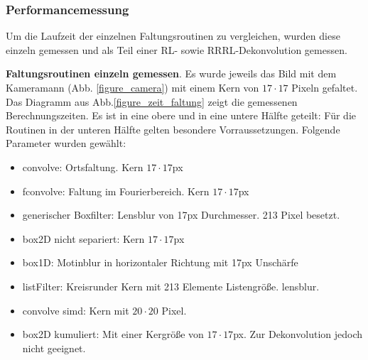 \documentclass[a4paper,12pt]{article}
\begin{document}
\subsubsection{Performancemessung}
Um die Laufzeit der einzelnen Faltungsroutinen zu vergleichen, wurden diese
einzeln gemessen und als Teil einer RL- sowie RRRL-Dekonvolution gemessen.

\textbf{Faltungsroutinen einzeln gemessen}. Es wurde jeweils das Bild mit dem
Kameramann (Abb. \ref{figure_camera}) mit einem Kern von $17 \cdot 17$ Pixeln
gefaltet. Das Diagramm aus Abb.\ref{figure_zeit_faltung} zeigt die gemessenen
Berechnungszeiten. Es ist in eine obere und in eine untere Hälfte geteilt: 
Für die Routinen in der unteren Hälfte gelten besondere Vorraussetzungen.
Folgende Parameter wurden gewählt:
\begin{itemize}
  \itemsep -1pt
  \item convolve: Ortsfaltung. Kern $17 \cdot 17$px
  \item fconvolve: Faltung im Fourierbereich. Kern $17 \cdot 17$px
  \item generischer Boxfilter: Lensblur von 17px Durchmesser.
  213 Pixel besetzt.
  \item box2D nicht separiert: Kern $17 \cdot 17$px
  \item box1D: Motinblur in horizontaler Richtung mit 17px Unschärfe
  \item listFilter: Kreisrunder Kern mit 213 Elemente Listengröße. lensblur.
  \item convolve simd: Kern mit $20 \cdot 20$ Pixel.
  \item box2D kumuliert: Mit einer Kergröße von $17 \cdot 17$px. Zur
  Dekonvolution jedoch nicht geeignet.
\end{itemize}
\end{document}
